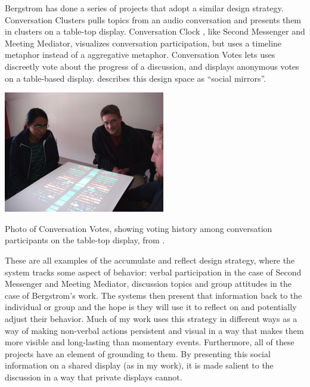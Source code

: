 \documentclass{tufte-handout}
\begin{document}
Bergstrom has done a series of projects that adopt a similar design strategy. Conversation Clusters \citep{Bergstrom:2009fe} pulls topics from an audio conversation and presents them in clusters on a table-top display. Conversation Clock \citep{Bergstrom:2007je}, like Second Messenger and Meeting Mediator, visualizes conversation participation, but uses a timeline metaphor instead of a aggregative metaphor. Conversation Votes \citep{Bergstrom:2009ej} lets uses discreetly vote about the progress of a discussion, and displays anonymous votes on a table-based display. \citet{Bergstrom:hu} describes this design space as ``social mirrors''. 

\begin{marginfigure}
	\includegraphics{figures/conversation_votes.jpg}
	\caption{Photo of Conversation Votes, showing voting history among conversation participants on the table-top display, from \citep{Bergstrom:2009ej}.}
	\label{fig:conversation-votes}
\end{marginfigure}




These are all examples of the accumulate and reflect design strategy, where the system tracks some aspect of behavior: verbal participation in the case of Second Messenger and Meeting Mediator, discussion topics and group attitudes in the case of Bergstrom's work. The systems then present that information back to the individual or group and the hope is they will use it to reflect on and potentially adjust their behavior. Much of my work uses this strategy in different ways as a way of making non-verbal actions persistent and visual in a way that makes them more visible and long-lasting than momentary events.  Furthermore, all of these projects have an element of grounding to them. By presenting this social information on a shared display (as in my work), it is made salient to the discussion in a way that private displays cannot.
\end{document}
